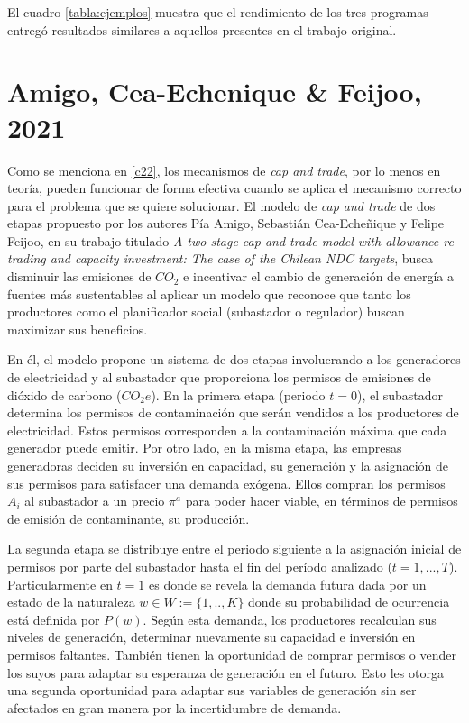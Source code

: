 El cuadro \ref{tabla:ejemplos} muestra que el rendimiento de los tres programas entregó resultados similares a aquellos presentes en el trabajo original.



\section{Amigo, Cea-Echenique \& Feijoo, 2021}

Como se menciona en \ref{c22}, los mecanismos de \textit{cap and trade}, por lo menos en teoría, pueden funcionar de forma efectiva cuando se aplica el mecanismo correcto para el problema que se quiere solucionar. El modelo de \textit{cap and trade} de dos etapas propuesto por los autores Pía Amigo, Sebastián Cea-Echeñique y Felipe Feijoo, en su trabajo titulado \textit{A two stage cap-and-trade model with allowance re-trading and capacity investment: The case of the Chilean NDC targets}, busca disminuir las emisiones de $CO_2$ e incentivar el cambio de generación de energía a fuentes más sustentables al aplicar un modelo que reconoce que tanto los productores como el planificador social (subastador o regulador) buscan maximizar sus beneficios.
\vspace{2.5mm}

En él, el modelo propone un sistema de dos etapas involucrando a los generadores de electricidad y al subastador que proporciona los permisos de emisiones de dióxido de carbono ($CO_2 e$). En la primera etapa (periodo $t=0$), el subastador determina los permisos de contaminación que serán vendidos a los productores de electricidad. Estos permisos corresponden a la contaminación máxima que cada generador puede emitir. Por otro lado, en la misma etapa, las empresas generadoras deciden su inversión en capacidad, su generación y la asignación de sus permisos para satisfacer una demanda exógena. Ellos compran los permisos $A_i$ al subastador a un precio $\pi^a$ para poder hacer viable, en términos de permisos de emisión de contaminante, su producción. 
\vspace{2.5mm}

La segunda etapa se distribuye entre el periodo siguiente a la asignación inicial de permisos por parte del subastador hasta el fin del período analizado ($t=1,...,T$). Particularmente en $t=1$ es donde se revela la demanda futura dada por un estado de la naturaleza $w \in W :=\{ 1,..,K\}$ donde su probabilidad de ocurrencia está definida por $P(w)$. Según esta demanda, los productores recalculan sus niveles de generación, determinar nuevamente su capacidad e inversión en permisos faltantes. También tienen la oportunidad de comprar permisos o vender los suyos para adaptar su esperanza de generación en el futuro. Esto les otorga una segunda oportunidad para adaptar sus variables de generación sin ser afectados en gran manera por la incertidumbre de demanda.
\vspace{2.5mm}

